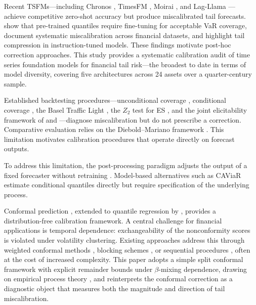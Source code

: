 \documentclass[preprint,11pt,authoryear]{elsarticle}
\newcommand{\1}{\boldsymbol{1}}
\begin{document}
	Recent TSFMs---including Chronos
	\citep{ansari2024chronos,ansari2025chronos2}, TimesFM
	\citep{das2024timesfm}, Moirai
	\citep{woo2024moirai,liu2024moirai2}, and Lag-Llama
	\citep{rasul2024lagllama}---achieve competitive zero-shot
	accuracy but produce miscalibrated tail forecasts.
	\citet{goel2024tsfmvar} show that pre-trained quantiles
	require fine-tuning for acceptable VaR coverage,
	\citet{rahimikia2025revisiting} document systematic
	miscalibration across financial datasets, and
	\citet{pele2025llmvar} highlight tail compression in
	instruction-tuned models. These findings motivate post-hoc
	correction approaches. This study provides a systematic
	calibration audit of time series foundation models for financial
	tail risk---the broadest to date in terms of model diversity, covering five architectures across 24 assets over a
	quarter-century sample.

	Established backtesting procedures---unconditional coverage
	\citep{kupiec1995}, conditional coverage
	\citep{christoffersen1998}, the Basel Traffic Light
	\citep{basel1996}, the $Z_2$ test for ES
	\citep{acerbi2014back}, and the joint elicitability framework
	of \citet{fissler2016higher} and
	\citet{nolde2017elicitability}---diagnose miscalibration but
	do not prescribe a correction. Comparative evaluation relies
	on the Diebold--Mariano framework
	\citep{diebold1995comparing,harvey1997testing}. This
	limitation motivates calibration procedures that operate
	directly on forecast outputs.
	
	To address this limitation, the post-processing paradigm adjusts
	the output of a fixed forecaster without retraining
	\citep{gneiting2013combining, brehmer2021properification,
		taillardat2016calibrated}. Model-based
	alternatives such as CAViaR \citep{engle2004caviar} estimate
	conditional quantiles directly but require specification of
	the underlying process.
	
	Conformal prediction \citep{vovk2005algorithmic}, extended to
	quantile regression by \citet{romano2019conformalized},
	provides a distribution-free calibration framework. A central
	challenge for financial applications is temporal dependence:
	exchangeability of the nonconformity scores is violated under volatility clustering.
	Existing approaches address this through weighted conformal
	methods \citep{barber2023conformal}, blocking schemes
	\citep{chernozhukov2018exact}, or sequential procedures
	\citep{gibbs2021adaptive, zaffran2022conformal,
		xu2024conformal}, often at the cost of increased complexity.
	This paper adopts a simple split conformal framework with
	explicit remainder bounds under $\beta$-mixing dependence,
	drawing on empirical process theory
	\citep{rio2017asymptotic, yu1994rates}, and reinterprets the
	conformal correction as a diagnostic object that measures both
	the magnitude and direction of tail miscalibration.
	
\end{document}
